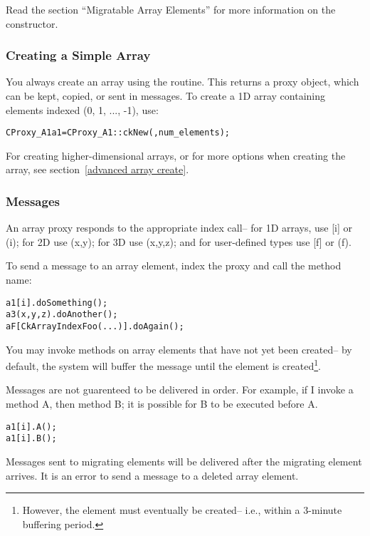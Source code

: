 Read the section ``Migratable Array Elements'' for more
information on the  constructor. 


\subsubsection{Creating a Simple Array}

You always create an array using the 
routine.  This returns a proxy object, which can
be kept, copied, or sent in messages.
To create a 1D array containing elements indexed 
(0, 1, ..., -1), use:

\begin{alltt}
CProxy_A1 a1 = CProxy_A1::ckNew(,num_elements);
\end{alltt}

For creating higher-dimensional arrays, or for more options
when creating the array, see section~\ref{advanced array create}.


\subsubsection{Messages}

An array proxy responds to the appropriate index call--
for 1D arrays, use [i] or (i); for 2D use (x,y); for 3D
use (x,y,z); and for user-defined types use [f] or (f).

To send a  message to an array element, index the proxy 
and call the method name:

\begin{alltt}
a1[i].doSomething();
a3(x,y,z).doAnother();
aF[CkArrayIndexFoo(...)].doAgain();
\end{alltt}

You may invoke methods on array elements that have not yet
been created-- by default, the system will buffer the message until the
element is created\footnote{However, the element must eventually be 
created-- i.e., within a 3-minute buffering period.}.

Messages are not guarenteed to be delivered in order.
For example, if I invoke a method A, then method B;
it is possible for B to be executed before A.

\begin{alltt}
a1[i].A();
a1[i].B();
\end{alltt}

Messages sent to migrating elements will be delivered after
the migrating element arrives.  It is an error to send 
a message to a deleted array element.


